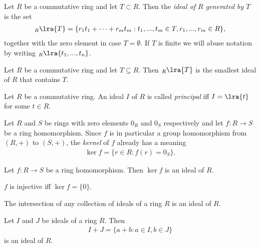 \documentclass{article}
\begin{document}
\begin{definition}
	Let $R$ be a commutative ring and let $T\subset R$. Then the \emph{ideal of $R$
		generated by $T$} is the set
	\begin{align*}
		_R\lra{T} = \{r_1t_1+\cdots+r_mt_m : t_1,...,t_m\in T,r_1,...,r_m\in R\},
	\end{align*}
	together with the zero element in case $T=\emptyset$. If $T$ is finite we will
	abuse notation by writing $_R\lra{t_1,...,t_n}$.
\end{definition}

\begin{proposition}[Notes 3.4.14]
	Let $R$ be a commutative ring and let $T\subseteq R$. Then $_R\lra{T}$ is the
	smallest ideal of $R$ that contains $T$.
\end{proposition}

\begin{definition}
	Let $R$ be a commutative ring. An ideal $I$ of $R$ is called \emph{principal} iff
	$I=\lra{t}$ for some $t\in R$.
\end{definition}

\begin{definition}
	Let $R$ and $S$ be rings with zero elements $0_R$ and $0_S$ respectively and
	let $f:R\to S$ be a ring homomorphism. Since $f$ is in particular a group homomorphism
	from $(R,+)$ to $(S,+)$, the \emph{kernel} of $f$ already has a meaning
	\begin{align*}
		\ker f = \{r\in R : f(r) = 0_S\}.
	\end{align*}
\end{definition}

\begin{proposition}[Notes 3.4.18]
	Let $f:R\to S$ be a ring homomorphism. Then $\ker f$ is an ideal of $R$.
\end{proposition}

\begin{lemma}[Notes 3.4.20]
	$f$ is injective iff $\ker f = \{0\}$.
\end{lemma}

\begin{lemma}[Notes 3.4.21]
	The intersection of any collection of ideals of a ring $R$ is an ideal of $R$.
\end{lemma}

\begin{lemma}[Notes 3.4.22]
	Let $I$ and $J$ be ideals of a ring $R$. Then
	\begin{align*}
		I+J=\{a+b:a\in I, b\in J\}
	\end{align*}
	is an ideal of $R$.
\end{lemma}
\end{document}
